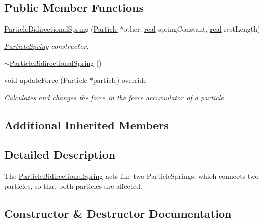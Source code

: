 \subsection*{Public Member Functions}
\begin{DoxyCompactItemize}
\item 
\mbox{\hyperlink{classr3_1_1_particle_bidirectional_spring_ac805f977d1adc647c2c5193e35c63f56}{Particle\+Bidirectional\+Spring}} (\mbox{\hyperlink{classr3_1_1_particle}{Particle}} $\ast$other, \mbox{\hyperlink{namespacer3_ab2016b3e3f743fb735afce242f0dc1eb}{real}} spring\+Constant, \mbox{\hyperlink{namespacer3_ab2016b3e3f743fb735afce242f0dc1eb}{real}} rest\+Length)
\begin{DoxyCompactList}\small\item\em \mbox{\hyperlink{classr3_1_1_particle_spring}{Particle\+Spring}} constructor. \end{DoxyCompactList}\item 
\mbox{\hyperlink{classr3_1_1_particle_bidirectional_spring_aa390c4a3d88cb2fe39cba699abbfab35}{$\sim$\+Particle\+Bidirectional\+Spring}} ()
\item 
void \mbox{\hyperlink{classr3_1_1_particle_bidirectional_spring_a13ac531b70d2884364fba66aae55b5fb}{update\+Force}} (\mbox{\hyperlink{classr3_1_1_particle}{Particle}} $\ast$particle) override
\begin{DoxyCompactList}\small\item\em Calculates and changes the force in the force accumulator of a particle. \end{DoxyCompactList}\end{DoxyCompactItemize}
\subsection*{Additional Inherited Members}


\subsection{Detailed Description}
The \mbox{\hyperlink{classr3_1_1_particle_bidirectional_spring}{Particle\+Bidirectional\+Spring}} acts like two Particle\+Springs, which connects two particles, so that both particles are affected. 

\subsection{Constructor \& Destructor Documentation}
\mbox{\label{classr3_1_1_particle_bidirectional_spring_ac805f977d1adc647c2c5193e35c63f56}} 
